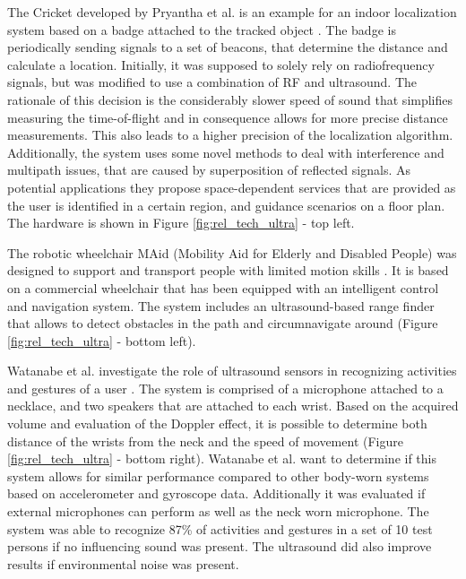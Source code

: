 The Cricket developed by Pryantha et al. is an example for an indoor localization system based on a badge attached to the tracked object \cite{priyantha2000cricket}. The badge is periodically sending signals to a set of beacons, that determine the distance and calculate a location. Initially, it was supposed to solely rely on radiofrequency signals, but was modified to use a combination of RF and ultrasound. The rationale of this decision is the considerably slower speed of sound that simplifies measuring the time-of-flight and in consequence allows for more precise distance measurements. This also leads to a higher precision of the localization algorithm. Additionally, the system uses some novel methods to deal with interference and multipath issues, that are caused by superposition of reflected signals. As potential applications they propose space-dependent services that are provided as the user is identified in a certain region, and guidance scenarios on a floor plan. The hardware is shown in Figure \ref{fig:rel_tech_ultra} - top left.

The robotic wheelchair MAid (Mobility Aid for Elderly and Disabled People) was designed to support and transport people with limited motion skills \cite{prassler2001robotics}. It is based on a commercial wheelchair that has been equipped with an intelligent control and navigation system. The system includes an ultrasound-based range finder that allows to detect obstacles in the path and circumnavigate around (Figure \ref{fig:rel_tech_ultra} - bottom left). 

Watanabe et al. investigate the role of ultrasound sensors in recognizing activities and gestures of a user \cite{watanabe2013ultrasound}. The system is comprised of a microphone attached to a necklace, and two speakers that are attached to each wrist. Based on the acquired volume and evaluation of the Doppler effect, it is possible to determine both distance of the wrists from the neck and the speed of movement (Figure \ref{fig:rel_tech_ultra} - bottom right). Watanabe et al. want to determine if this system allows for similar performance compared to other body-worn systems based on accelerometer and gyroscope data. Additionally it was evaluated if external microphones can perform as well as the neck worn microphone. The system was able to recognize 87\% of activities and gestures in a set of 10 test persons if no influencing sound was present. The ultrasound did also improve results if environmental noise was present.

